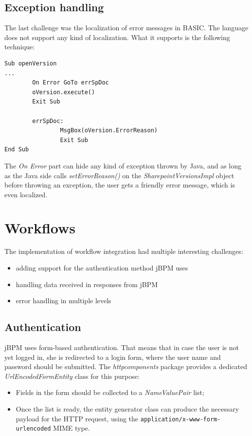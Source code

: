\subsection{Exception handling}

The last challenge was the localization of error messages in BASIC. The
language does not support any kind of localization. What it supports is the
following technique:

\begin{lstlisting}
Sub openVersion
...
        On Error GoTo errSpDoc
        oVersion.execute()
        Exit Sub

        errSpDoc:
                MsgBox(oVersion.ErrorReason)
                Exit Sub
End Sub
\end{lstlisting}

The \emph{On Error} part can hide any kind of exception thrown by Java, and as
long as the Java side calls \emph{setErrorReason()} on the
\emph{SharepointVersionsImpl} object before throwing an exception, the user gets
a friendly error message, which is even localized.

\section{Workflows}

The implementation of workflow integration had multiple interesting challenges:

\begin{itemize}
\item adding support for the authentication method jBPM uses
\item handling data received in responses from jBPM
\item error handling in multiple levels
\end{itemize}

\subsection{Authentication}

jBPM uses form-based authentication. That means that in case the user is not
yet logged in, she is redirected to a login form, where the user name and
password should be submitted. The \emph{httpcomponents} package provides a
dedicated \emph{UrlEncodedFormEntity} class for this purpose:

\begin{itemize}
\item Fields in the form should be collected to a \emph{NameValuePair} list;
\item Once the list is ready, the entity generator class can produce the
necessary payload for the HTTP request, using the
\texttt{application/x-www-form-urlencoded} MIME type\cite{form-encoding}.
\end{itemize}

